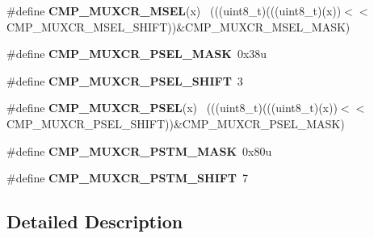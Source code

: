 \begin{DoxyCompactItemize}
\item 
\hypertarget{group___c_m_p___register___masks_ga61a47f441cc9f0145482ce3f1561160a}{}\#define {\bfseries C\+M\+P\+\_\+\+M\+U\+X\+C\+R\+\_\+\+M\+S\+E\+L}(x)                                            ~(((uint8\+\_\+t)(((uint8\+\_\+t)(x))$<$$<$C\+M\+P\+\_\+\+M\+U\+X\+C\+R\+\_\+\+M\+S\+E\+L\+\_\+\+S\+H\+I\+F\+T))\&C\+M\+P\+\_\+\+M\+U\+X\+C\+R\+\_\+\+M\+S\+E\+L\+\_\+\+M\+A\+S\+K)\label{group___c_m_p___register___masks_ga61a47f441cc9f0145482ce3f1561160a}

\item 
\hypertarget{group___c_m_p___register___masks_gaba9739da107b2a2b908af338d14df160}{}\#define {\bfseries C\+M\+P\+\_\+\+M\+U\+X\+C\+R\+\_\+\+P\+S\+E\+L\+\_\+\+M\+A\+S\+K}~0x38u\label{group___c_m_p___register___masks_gaba9739da107b2a2b908af338d14df160}

\item 
\hypertarget{group___c_m_p___register___masks_gab686629f56ced4b88c699f0f610dece5}{}\#define {\bfseries C\+M\+P\+\_\+\+M\+U\+X\+C\+R\+\_\+\+P\+S\+E\+L\+\_\+\+S\+H\+I\+F\+T}~3\label{group___c_m_p___register___masks_gab686629f56ced4b88c699f0f610dece5}

\item 
\hypertarget{group___c_m_p___register___masks_gae2f01a26dfcb880ec6dcca859629c743}{}\#define {\bfseries C\+M\+P\+\_\+\+M\+U\+X\+C\+R\+\_\+\+P\+S\+E\+L}(x)                                            ~(((uint8\+\_\+t)(((uint8\+\_\+t)(x))$<$$<$C\+M\+P\+\_\+\+M\+U\+X\+C\+R\+\_\+\+P\+S\+E\+L\+\_\+\+S\+H\+I\+F\+T))\&C\+M\+P\+\_\+\+M\+U\+X\+C\+R\+\_\+\+P\+S\+E\+L\+\_\+\+M\+A\+S\+K)\label{group___c_m_p___register___masks_gae2f01a26dfcb880ec6dcca859629c743}

\item 
\hypertarget{group___c_m_p___register___masks_ga5636686e652e5c89b119ff1954c0e98a}{}\#define {\bfseries C\+M\+P\+\_\+\+M\+U\+X\+C\+R\+\_\+\+P\+S\+T\+M\+\_\+\+M\+A\+S\+K}~0x80u\label{group___c_m_p___register___masks_ga5636686e652e5c89b119ff1954c0e98a}

\item 
\hypertarget{group___c_m_p___register___masks_gafd77773e4a14b8f22b0b00c52a180d0c}{}\#define {\bfseries C\+M\+P\+\_\+\+M\+U\+X\+C\+R\+\_\+\+P\+S\+T\+M\+\_\+\+S\+H\+I\+F\+T}~7\label{group___c_m_p___register___masks_gafd77773e4a14b8f22b0b00c52a180d0c}

\end{DoxyCompactItemize}


\subsection{Detailed Description}
